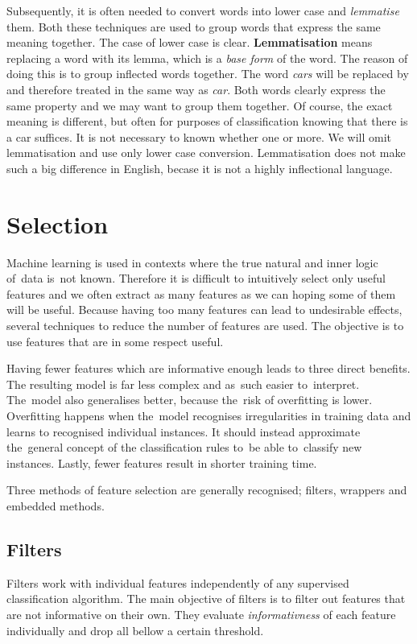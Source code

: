 Subsequently, it is often needed to convert words into lower case and {\it lemmatise} them.
Both these techniques are used to group words that express the same meaning together.
The case of lower case is clear.
{\bf Lemmatisation} means replacing a word with its lemma, which is a {\it base form} of the word.
The reason of doing this is to group inflected words together.
The word \textit{cars} will be replaced by and therefore treated in the same way as \textit{car}.
Both words clearly express the same property and we may want to group them together.
Of course, the exact meaning is different,
but often for purposes of classification knowing that there is a car suffices.
It is not necessary to known whether one or more.
We will omit lemmatisation and use only lower case conversion.
Lemmatisation does not make such a big difference in English,
becase it is not a highly inflectional language.

\section{Selection}

Machine learning is used in contexts where the true natural and inner logic of~data is~not known.
Therefore it is difficult to intuitively select only useful features
and we often extract as many features as we can hoping some of them will be useful.
Because having too many features can lead to undesirable effects,
several techniques to reduce the number of features are used.
The objective is to use features that are in some respect useful.

Having fewer features which are informative enough leads to three direct benefits.
The resulting model is far less complex and as~such easier to~interpret.
The~model also generalises better, because the~risk of overfitting is lower.
Overfitting happens when the~model recognises irregularities in training data
and learns to recognised individual instances.
It should instead approximate the~general concept of the classification rules
to~be able to~classify new instances.
Lastly, fewer features result in shorter training time.

Three methods of feature selection are generally recognised; filters, wrappers and embedded methods.

\subsection{Filters}

Filters work with individual features independently of any supervised classification algorithm.
The main objective of filters is to filter out features that are not informative on their own.
They evaluate {\it informativness} of each feature individually
and drop all bellow a certain threshold.

